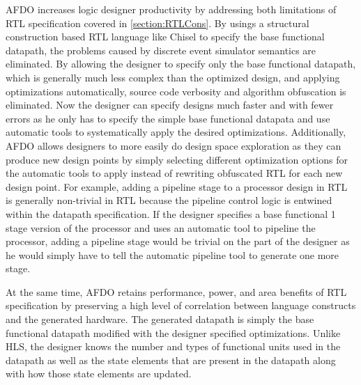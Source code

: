 AFDO increases logic designer productivity by addressing both limitations of RTL specification covered in \ref{section:RTLCons}. By usings a structural construction based RTL language like Chisel to specify the base functional datapath, the problems caused by discrete event simulator semantics are eliminated. By allowing the designer to specify only the base functional datapath, which is generally much less complex than the optimized design, and applying optimizations automatically, source code verbosity and algorithm obfuscation is eliminated. Now the designer can specify designs much faster and with fewer errors as he only has to specify the simple base functional datapata and use automatic tools to systematically apply the desired optimizations. Additionally, AFDO allows designers to more easily do design space exploration as they can produce new design points by simply selecting different optimization options for the automatic tools to apply instead of rewriting obfuscated RTL for each new design point. For example, adding a pipeline stage to a processor design in RTL is generally non-trivial in RTL because the pipeline control logic is entwined within the datapath specification. If the designer specifies a base functional 1 stage version of the processor and uses an automatic tool to pipeline the processor, adding a pipeline stage would be trivial on the part of the designer as he would simply have to tell the automatic pipeline tool to generate one more stage.

At the same time, AFDO retains performance, power, and area benefits of RTL specification by preserving a high level of correlation between language constructs and the generated hardware. The generated datapath is simply the base functional datapath modified with the designer specified optimizations. Unlike HLS, the designer knows the number and types of functional units used in the datapath as well as the state elements that are present in the datapath along with how those state elements are updated.
